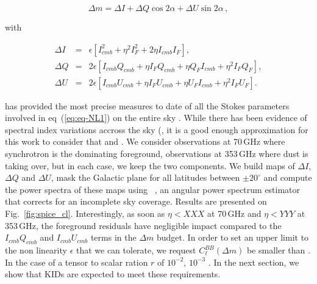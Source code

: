 {\begin{equation}
\Delta m = \Delta I + \Delta Q\cos2\alpha + \Delta U\sin2\alpha\,,
\label{eq:eq-NL1}
\end{equation}

with

\begin{eqnarray}
\Delta I &=& \epsilon\left[I_{cmb}^2 + \eta^2 I_F^2 + 2\eta I_{cmb}I_F\right],\\
\Delta Q &=& 2\epsilon\left[I_{cmb}Q_{cmb} + \eta I_FQ_{cmb} + \eta Q_FI_{cmb} +
\eta^2I_FQ_F\right],\\
\Delta U &=& 2\epsilon\left[I_{cmb}U_{cmb} + \eta I_FU_{cmb} + \eta U_FI_{cmb} +
\eta^2I_FU_F\right].
\end{eqnarray}

\planck has provided the most precise measures to date of all the Stokes
parameters involved in eq~(\ref{eq:eq-NL1}) on the entire sky
\cite{2016A&A...594A..10P}. While there has been evidence of spectral index
variations accross the sky (, it is a good
enough approximation for this work to consider that  and . We consider observations at
70\,GHz where synchrotron is the dominating foreground, observations at 353\,GHz
where dust is taking over, but in each case, we keep the two components. We
build maps of $\Delta I$, $\Delta Q$ and $\Delta U$, mask the Galactic plane for
all latitudes between $\pm 20^\circ$ and compute the power spectra of these maps
using \spice\ \citep{2004MNRAS.350..914C}, an angular power spectrum estimator
that corrects for an incomplete sky coverage. Results are presented on
Fig.~\ref{fig:spice_cl}. Interestingly, as soon as $\eta < XXX$ at 70\,GHz and
$\eta<YYY$ at 353\,GHz, the foreground residuals have negligible impact compared
to the $I_{cmb}Q_{cmb}$ and $I_{cmb}U_{cmb}$ terms in the $\Delta m$ budget. In
order to set an upper limit to the non linearity $\epsilon$ that we can
tolerate, we request $C^{BB}_\ell(\Delta m)$ be smaller than . In the
case of a tensor to scalar ration $r$ of $10^{-2}$, $10^{-3}$ . In the next section, we show that KIDs are expected to meet
these requirements.


}
